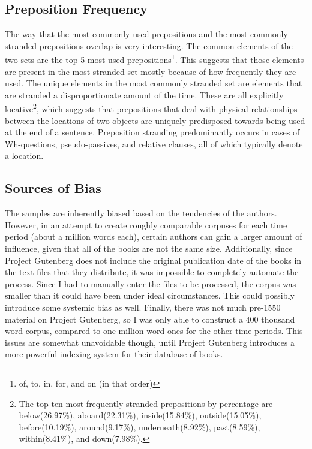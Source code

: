 \documentclass[DIV=calc, paper=letter, fontsize=12pt]{scrartcl}	 %
\begin{document}
\begin{multicols}{2}
\subsection{Preposition Frequency}

The way that the most commonly used prepositions and the most commonly stranded prepositions overlap is very interesting. The common elements of the two sets are the top 5 most used prepositions\footnote{of, to, in, for, and on (in that order)}. This suggests that those elements are present in the
most stranded set mostly because of how frequently they are used. %
The unique elements in the most commonly stranded set are elements that are stranded a disproportionate amount of the time. These are all explicitly locative\footnote{The top ten most frequently stranded prepositions by percentage are below(26.97\%), aboard(22.31\%), inside(15.84\%), outside(15.05\%), before(10.19\%), around(9.17\%), underneath(8.92\%), past(8.59\%), within(8.41\%), and down(7.98\%).}, which suggests that prepositions that deal with physical relationships between the locations of two objects are uniquely predisposed towards being used at the end of a sentence. Preposition stranding predominantly occurs in cases of Wh-questions, pseudo-passives, and relative clauses, all of which typically denote a location. 

\subsection{Sources of Bias}
The samples are inherently biased based on the tendencies of the authors. However, in an attempt to create roughly comparable corpuses for each time period (about a million words each), certain authors can gain a larger amount of influence, given that all of the books are not the same size. Additionally, since Project Gutenberg does not include the original publication date of the books in the  text files that they distribute, it was impossible to completely automate the process. Since I had to manually enter the files to be processed, the corpus was smaller than it could have been under ideal circumstances. This could possibly introduce some systemic bias as well. Finally, there was not much
pre-1550 material on Project Gutenberg, so I was only able to construct a 400 thousand word corpus, compared to one million word ones for the other time periods. This issues are somewhat unavoidable though, until Project Gutenberg introduces a more powerful indexing system for their database of books. 


\end{multicols}
\end{document}
